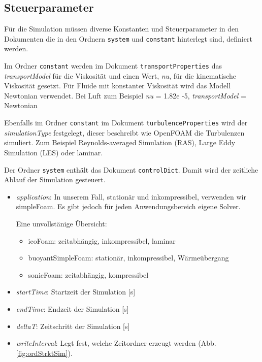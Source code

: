 \subsection{Steuerparameter \label{openfoam:section:Steuerparameter}}
Für die Simulation müssen diverse Konstanten und Steuerparameter in den Dokumenten die in den Ordnern \texttt{system} und \texttt{constant} hinterlegt sind, definiert werden.

Im Ordner \texttt{constant} werden im Dokument \texttt{transportProperties} das \textit{transportModel} für die Viskosität und einen Wert, \textit{nu}, für die kinematische Viskosität gesetzt.
Für Fluide mit konstanter Viskosität wird das Modell Newtonian verwendet. Bei Luft zum Beispiel \textit{nu} = 1.82e -5, \textit{transportModel} = Newtonian

Ebenfalls im Ordner \texttt{constant} im Dokument \texttt{turbulenceProperties} wird der \textit{simulationType} festgelegt, dieser beschreibt wie OpenFOAM die Turbulenzen simuliert.
Zum Beispiel Reynolds-averaged Simulation (RAS), Large Eddy Simulation (LES) oder laminar.

Der Ordner \texttt{system} enthält das Dokument \texttt{controlDict}. Damit wird der zeitliche Ablauf der Simulation gesteuert.

\begin{itemize}
    \item \textit{application}: In unserem Fall, stationär und inkompressibel, 
    verwenden wir simpleFoam. Es gibt jedoch für jeden Anwendungsbereich eigene Solver.

    Eine unvollstänige Übersicht:
    \begin{itemize}
        \item icoFoam: zeitabhängig, inkompressibel, laminar
        \item buoyantSimpleFoam: stationär, inkompressibel, Wärmeübergang
        \item sonicFoam: zeitabhängig, kompressibel
    \end{itemize}
    \item \textit{startTime}: Startzeit der Simulation [s]
    \item \textit{endTime}: Endzeit der Simulation [s]
    \item \textit{deltaT}: Zeitschritt der Simulation [s]
    \item \textit{writeInterval}: Legt fest, welche Zeitordner erzeugt werden (Abb. \ref{fig:ordStrktSim}).
\end{itemize}

